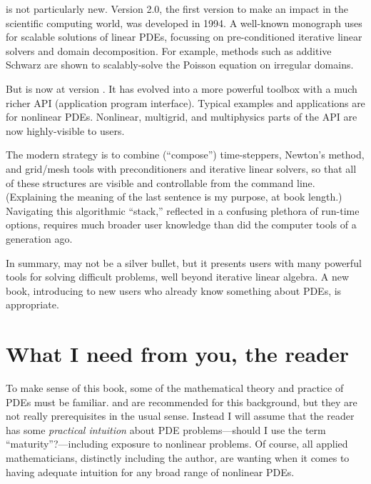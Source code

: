 \PETSc is not particularly new.  Version 2.0, the first version to make an impact in the scientific computing world, was developed in 1994.  A well-known monograph \citet{Smithetal1996} uses  for scalable solutions of linear PDEs, focussing on pre-conditioned iterative linear solvers and domain decomposition.  For example, methods such as additive Schwarz are shown to scalably-solve the Poisson equation on irregular domains.

But \PETSc is now at version \PETSCVERSION.  It has evolved into a more powerful toolbox with a much richer API (application program interface).  Typical examples and applications are for nonlinear PDEs.  Nonlinear, multigrid, and multiphysics parts of the API are now highly-visible to users.

The modern \PETSc strategy is to combine (``compose'') time-steppers, Newton's method, and grid/mesh tools with preconditioners and iterative linear solvers, so that all of these structures are visible and controllable from the command line.  (Explaining the meaning of the last sentence is my purpose, at book length.)  Navigating this algorithmic ``stack,'' reflected in a confusing plethora of run-time options, requires much broader user knowledge than did the computer tools of a generation ago.

In summary, \PETSc may not be a silver bullet, but it presents users with many powerful tools for solving difficult problems, well beyond iterative linear algebra.  A new book, introducing \PETSc to new users who already know something about PDEs, is appropriate.


\section{What I need from you, the reader}

To make sense of this book, some of the mathematical theory and practice of PDEs must be familiar.  \citet{Evans2010} and \citet{Ockendonetal2003} are recommended for this background, but they are not really prerequisites in the usual sense.  Instead I will assume that the reader has some \emph{practical intuition} about PDE problems---should I use the term ``maturity''?---including exposure to nonlinear problems.  Of course, all applied mathematicians, distinctly including the author, are wanting when it comes to having adequate intuition for any broad range of nonlinear PDEs.

